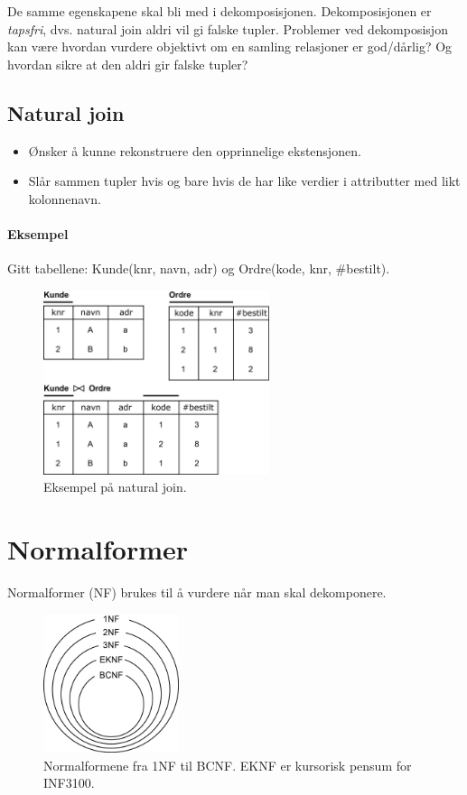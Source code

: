 \documentclass[12pt,a4paper]{article}
\begin{document}
De samme egenskapene skal bli med i dekomposisjonen. Dekomposisjonen er \textit{tapsfri}, dvs. natural join aldri vil gi falske tupler.
Problemer ved dekomposisjon kan være hvordan vurdere objektivt om en samling relasjoner er god/dårlig? Og hvordan sikre at den aldri gir falske tupler? 

\subsection{Natural join}
\begin{itemize}
\item{Ønsker å kunne rekonstruere den opprinnelige ekstensjonen.}
\item{Slår sammen tupler hvis og bare hvis de har like verdier i attributter med likt kolonnenavn.}
\end{itemize}

\paragraph{Eksempel}
Gitt tabellene: \textsf{Kunde(knr, navn, adr)} og \textsf{Ordre(kode, knr, \#bestilt)}. 

\begin{figure}[h!]
	\centering
		\includegraphics[width=250px]{img/eks1.png}
	\caption{Eksempel på natural join.}
\end{figure}

\section{Normalformer}

Normalformer (NF) brukes til å vurdere når man skal dekomponere.

\begin{figure}[h!]
	\centering
		\includegraphics[width=150px]{img/nf.png}
	\caption{Normalformene fra 1NF til BCNF. EKNF er kursorisk pensum for INF3100.}
\end{figure}
\end{document}

